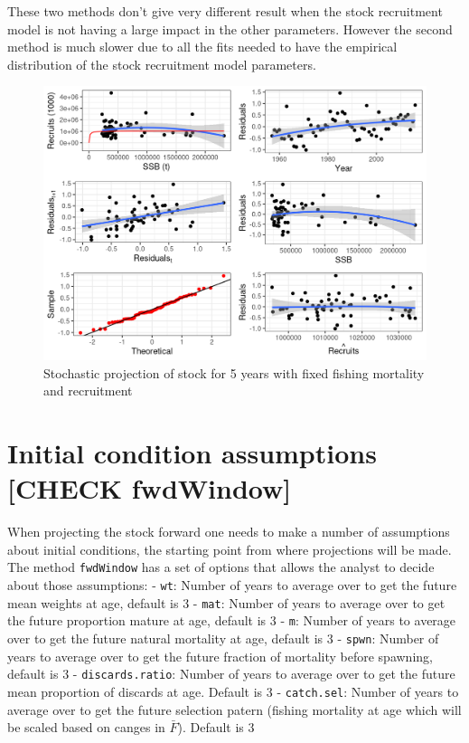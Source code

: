 \documentclass[
]{book}
\begin{document}
These two methods don't give very different result when the stock recruitment model is not having a large impact in the other parameters. However the second method is much slower due to all the fits needed to have the empirical distribution of the stock recruitment model parameters.

\begin{figure}
\centering
\includegraphics{_bookdown_files/_main_files/figure-html/unnamed-chunk-102-1.png}
\caption{\label{fig:unnamed-chunk-102}Stochastic projection of stock for 5 years with fixed fishing mortality and recruitment}
\end{figure}

\hypertarget{initial-condition-assumptions-check-fwdwindow}{%
\section{Initial condition assumptions {[}CHECK fwdWindow{]}}\label{initial-condition-assumptions-check-fwdwindow}}

When projecting the stock forward one needs to make a number of assumptions about initial conditions, the starting point from where projections will be made. The method \texttt{fwdWindow} has a set of options that allows the analyst to decide about those assumptions:
- \texttt{wt}: Number of years to average over to get the future mean weights at age, default is 3
- \texttt{mat}: Number of years to average over to get the future proportion mature at age, default is 3
- \texttt{m}: Number of years to average over to get the future natural mortality at age, default is 3
- \texttt{spwn}: Number of years to average over to get the future fraction of mortality before spawning, default is 3
- \texttt{discards.ratio}: Number of years to average over to get the future mean proportion of discards at age. Default is 3
- \texttt{catch.sel}: Number of years to average over to get the future selection patern (fishing mortality at age which will be scaled based on canges in \(\bar{F}\)). Default is 3
\end{document}
